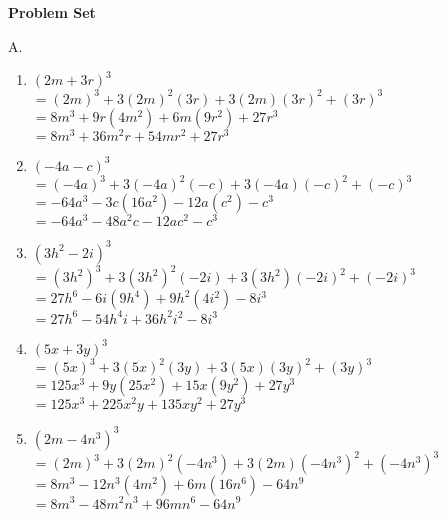 \textbf{Problem Set}

\vspce

A.  
\begin{enumerate}

\item \hspce $(2m + 3r)^{3}$\\
$=(2m)^{3}+3(2m)^{2}(3r)+3(2m)(3r)^{2}+(3r)^{3}$\\
$=8m^3+9r(4m^2)+6m(9r^2)+27r^3$\\
$=8m^3+36m^2r+54mr^2+27r^3$

\item \hspce $(-4a - c)^{3}$\\
$=(-4a)^{3}+3(-4a)^{2}(- c)+3(-4a)(- c)^{2}+(- c)^{3}$\\
$=-64a^{3}-3c(16a^{2})-12a(c^{2})- c^{3}$\\
$=-64a^{3}-48a^{2}c-12ac^{2}- c^{3}$

\item \hspce $(3h^{2} - 2i)^{3}$\\
$=(3h^{2})^{3}+3(3h^{2})^{2}(- 2i)+3(3h^{2})(- 2i)^{2}+(- 2i)^{3}$\\
$=27h^{6}-6i(9h^{4})+9h^{2}(4i^{2}) -8i^{3}$\\
$=27h^{6}-54h^{4}i+36h^{2}i^{2} -8i^{3}$

\item \hspce $(5x + 3y)^{3}$\\
$=(5x)^{3}+3(5x)^{2}(3y)+3(5x)(3y)^{2}+(3y)^{3}$\\
$= 125x^{3} + 9y(25x^{2}) + 15x(9y^{2}) + 27y^{3}$\\
$= 125x^{3} + 225x^{2}y + 135xy^{2} + 27y^{3}$

\item \hspce $(2m - 4n^{3})^{3}$\\
$=(2m)^{3} + 3(2m)^{2}(-4n^{3}) + 3(2m)(-4n^{3})^{2} + (-4n^{3})^{3}$\\
$=8m^{3} - 12n^{3}(4m^{2}) + 6m(16n^{6}) - 64n^{9}$\\
$=8m^{3} - 48m^{2}n^{3} + 96mn^{6} - 64n^{9}$

\end{enumerate}

